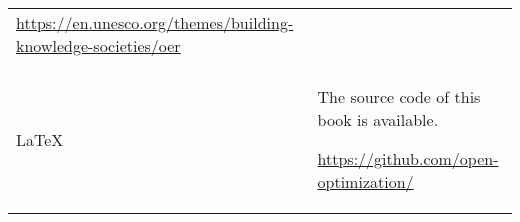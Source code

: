 \documentclass[../main/main.tex]{subfiles}
\begin{document}
\begin{tabular}{p{.3\linewidth}@{\qquad}p{.55\linewidth}}
\begin{minipage}[c]{\linewidth}
    \raggedleft
    \url{https://en.unesco.org/themes/building-knowledge-societies/oer}
  \end{minipage}
  \\\\[2ex]
  \begin{minipage}[c]{\linewidth}
    \centering\LARGE\LaTeX
  \end{minipage}
  & \begin{minipage}[c]{\linewidth}
    The source code of this book is available.\par\vspace{1ex}
    \raggedleft
    \url{https://github.com/open-optimization/}
  \end{minipage}
\end{tabular}

\begin{center}
\end{center}




\end{document}
